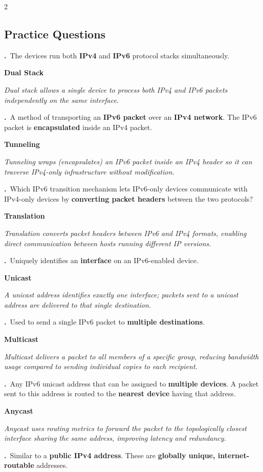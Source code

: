 \documentclass[9pt]{article}
\newcommand{\answer}[1]{%
  \par\nobreak\vspace{1pt}%
  \begin{tcolorbox}[
    colback=AnswerRed,
    colframe=AnswerRed,
    boxrule=0pt,
    arc=0pt,
    left=4pt, right=4pt,
    top=0.5pt, bottom=0.5pt,
    before skip=0pt,
    after skip=0pt
  ]
  {\footnotesize\bfseries\color{white}\RaggedRight #1}
  \end{tcolorbox}
}
\newcommand{\hl}[1]{\textbf{\textcolor{themeColor}{#1}}}
\newcommand{\explain}[1]{%
  \par\nobreak\vspace{0pt}%
  \begin{tcolorbox}[
    colback=LightBlueBg,
    colframe=SoftBlue!30,
    boxrule=0.3pt,
    arc=2pt,
    left=4pt, right=4pt,
    top=1pt, bottom=1pt,
    before skip=1pt,
    after skip=2pt
  ]
  {\footnotesize\color{MutedGray}\RaggedRight\itshape #1}
  \end{tcolorbox}
}
\newcounter{qnum}
\newcommand{\question}[1]{%
  \Needspace{4\baselineskip}%
  \stepcounter{qnum}%
  \par\vspace{3pt}%
  {\footnotesize\bfseries\color{themeColor}\theqnum.}\ {\footnotesize #1}%
}
\newcommand{\questioncolumns}[1]{%
  \begin{multicols}{2}
  \subsection*{Practice Questions}
  #1
  \end{multicols}
}
\begin{document}
\questioncolumns{
\question{The devices run both \hl{IPv4} and \hl{IPv6} protocol stacks simultaneously.}

\answer{Dual Stack}

\explain{Dual stack allows a single device to process both IPv4 and IPv6 packets independently on the same interface.}


\question{A method of transporting an \hl{IPv6 packet} over an \hl{IPv4 network}. The IPv6 packet is \hl{encapsulated} inside an IPv4 packet.}

\answer{Tunneling}

\explain{Tunneling wraps (encapsulates) an IPv6 packet inside an IPv4 header so it can traverse IPv4-only infrastructure without modification.}


\question{Which IPv6 transition mechanism lets IPv6-only devices communicate with IPv4-only devices by \hl{converting packet headers} between the two protocols?}

\answer{Translation}

\explain{Translation converts packet headers between IPv6 and IPv4 formats, enabling direct communication between hosts running different IP versions.}


\question{Uniquely identifies an \hl{interface} on an IPv6-enabled device.}

\answer{Unicast}

\explain{A unicast address identifies exactly one interface; packets sent to a unicast address are delivered to that single destination.}


\question{Used to send a single IPv6 packet to \hl{multiple destinations}.}

\answer{Multicast}

\explain{Multicast delivers a packet to all members of a specific group, reducing bandwidth usage compared to sending individual copies to each recipient.}


\question{Any IPv6 unicast address that can be assigned to \hl{multiple devices}. A packet sent to this address is routed to the \hl{nearest device} having that address.}

\answer{Anycast}

\explain{Anycast uses routing metrics to forward the packet to the topologically closest interface sharing the same address, improving latency and redundancy.}


\question{Similar to a \hl{public IPv4 address}. These are \hl{globally unique, internet-routable} addresses.}

}
\end{document}
